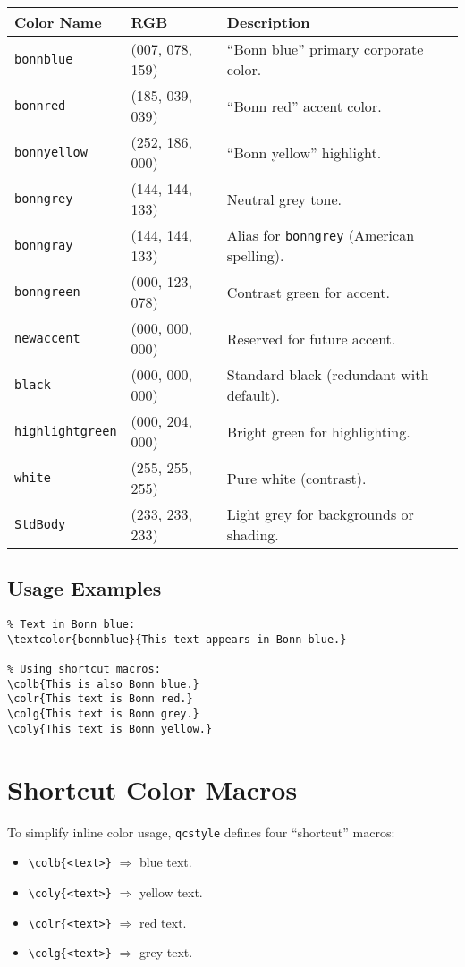 \documentclass[a4paper,12pt]{article}
\begin{document}
\bigskip
\begin{tabular}{@{}llp{8cm}@{}}
\textbf{Color Name}     & \textbf{RGB}        & \textbf{Description} \\
\midrule
\texttt{bonnblue}       & (007, 078, 159)        & “Bonn blue” primary corporate color. \\
\texttt{bonnred}        & (185, 039, 039)       & “Bonn red” accent color. \\
\texttt{bonnyellow}     & (252, 186, 000)       & “Bonn yellow” highlight. \\
\texttt{bonngrey}       & (144, 144, 133)     & Neutral grey tone. \\
\texttt{bonngray}       & (144, 144, 133)     & Alias for \texttt{bonngrey} (American spelling). \\
\texttt{bonngreen}      & (000, 123, 078)        & Contrast green for accent. \\
\midrule
\texttt{newaccent}      & (000, 000, 000)           & Reserved for future accent. \\
\texttt{black}          & (000, 000, 000)           & Standard black (redundant with default). \\
\texttt{highlightgreen} & (000, 204, 000)         & Bright green for highlighting. \\
\texttt{white}          & (255, 255, 255)     & Pure white (contrast). \\
\texttt{StdBody}        & (233, 233, 233)     & Light grey for backgrounds or shading. \\
\end{tabular}

\bigskip
\subsection{Usage Examples}
\begin{verbatim}
% Text in Bonn blue:
\textcolor{bonnblue}{This text appears in Bonn blue.}

% Using shortcut macros:
\colb{This is also Bonn blue.}
\colr{This text is Bonn red.}
\colg{This text is Bonn grey.}
\coly{This text is Bonn yellow.}
\end{verbatim}

\section{Shortcut Color Macros}
\label{sec:shortcuts}
To simplify inline color usage, \texttt{qcstyle} defines four “shortcut” macros:
\begin{itemize}
  \item \verb|\colb{<text>}|  $\Rightarrow$ \textcolor{bonnblue}{blue} text.
  \item \verb|\coly{<text>}|  $\Rightarrow$ \textcolor{bonnyellow}{yellow} text.
  \item \verb|\colr{<text>}|  $\Rightarrow$ \textcolor{bonnred}{red} text.
  \item \verb|\colg{<text>}|  $\Rightarrow$ \textcolor{bonngrey}{grey} text.
\end{itemize}
\end{document}
